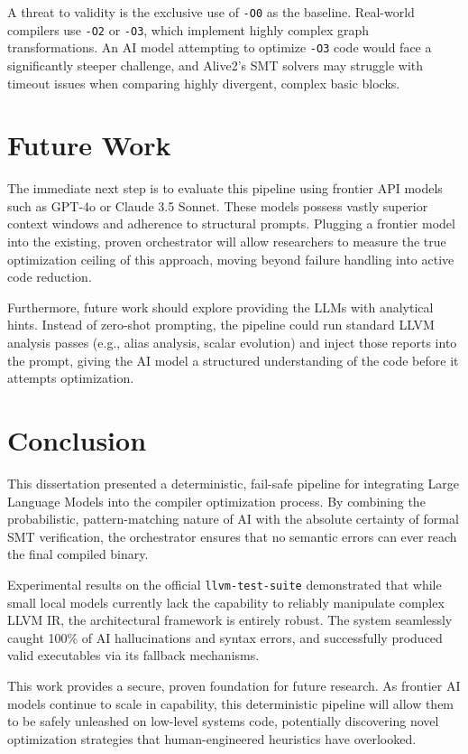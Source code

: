 \documentclass[conference,10pt]{IEEEtran}
\begin{document}
A threat to validity is the exclusive use of \texttt{-O0} as the baseline. Real-world compilers use \texttt{-O2} or \texttt{-O3}, which implement highly complex graph transformations. An AI model attempting to optimize \texttt{-O3} code would face a significantly steeper challenge, and Alive2's SMT solvers may struggle with timeout issues when comparing highly divergent, complex basic blocks.

\section{Future Work}
The immediate next step is to evaluate this pipeline using frontier API models such as GPT-4o or Claude 3.5 Sonnet. These models possess vastly superior context windows and adherence to structural prompts. Plugging a frontier model into the existing, proven orchestrator will allow researchers to measure the true optimization ceiling of this approach, moving beyond failure handling into active code reduction.

Furthermore, future work should explore providing the LLMs with analytical hints. Instead of zero-shot prompting, the pipeline could run standard LLVM analysis passes (e.g., alias analysis, scalar evolution) and inject those reports into the prompt, giving the AI model a structured understanding of the code before it attempts optimization.

\section{Conclusion}
This dissertation presented a deterministic, fail-safe pipeline for integrating Large Language Models into the compiler optimization process. By combining the probabilistic, pattern-matching nature of AI with the absolute certainty of formal SMT verification, the orchestrator ensures that no semantic errors can ever reach the final compiled binary.

Experimental results on the official \texttt{llvm-test-suite} demonstrated that while small local models currently lack the capability to reliably manipulate complex LLVM IR, the architectural framework is entirely robust. The system seamlessly caught 100\% of AI hallucinations and syntax errors, and successfully produced valid executables via its fallback mechanisms. 

This work provides a secure, proven foundation for future research. As frontier AI models continue to scale in capability, this deterministic pipeline will allow them to be safely unleashed on low-level systems code, potentially discovering novel optimization strategies that human-engineered heuristics have overlooked.
\end{document}
